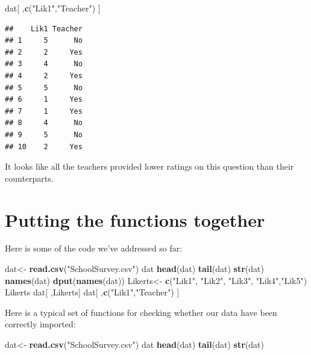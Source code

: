 \documentclass[
]{book}
\newenvironment{Shaded}{\begin{snugshade}}{\end{snugshade}}
\newcommand{\KeywordTok}[1]{\textcolor[rgb]{0.13,0.29,0.53}{\textbf{#1}}}
\newcommand{\NormalTok}[1]{#1}
\newcommand{\StringTok}[1]{\textcolor[rgb]{0.31,0.60,0.02}{#1}}
\begin{document}
\begin{Shaded}
\begin{Highlighting}[]
\NormalTok{dat[ ,}\KeywordTok{c}\NormalTok{(}\StringTok{"Lik1"}\NormalTok{,}\StringTok{"Teacher"}\NormalTok{) ]}
\end{Highlighting}
\end{Shaded}

\begin{verbatim}
##    Lik1 Teacher
## 1     5      No
## 2     2     Yes
## 3     4      No
## 4     2     Yes
## 5     5      No
## 6     1     Yes
## 7     1     Yes
## 8     4      No
## 9     5      No
## 10    2     Yes
\end{verbatim}

It looks like all the teachers provided lower ratings on this question than their counterparts.

\hypertarget{putting-the-functions-together}{%
\section{Putting the functions together}\label{putting-the-functions-together}}

Here is some of the code we've addressed so far:

\begin{Shaded}
\begin{Highlighting}[]
\NormalTok{dat<-}\StringTok{ }\KeywordTok{read.csv}\NormalTok{(}\StringTok{"SchoolSurvey.csv"}\NormalTok{)}
\NormalTok{dat}
\KeywordTok{head}\NormalTok{(dat)}
\KeywordTok{tail}\NormalTok{(dat)}
\KeywordTok{str}\NormalTok{(dat)}
\KeywordTok{names}\NormalTok{(dat)}
\KeywordTok{dput}\NormalTok{(}\KeywordTok{names}\NormalTok{(dat))}
\NormalTok{Likerts<-}\StringTok{ }\KeywordTok{c}\NormalTok{(}\StringTok{"Lik1"}\NormalTok{, }\StringTok{"Lik2"}\NormalTok{, }\StringTok{"Lik3"}\NormalTok{, }\StringTok{"Lik4"}\NormalTok{,}\StringTok{"Lik5"}\NormalTok{)}
\NormalTok{Likerts}
\NormalTok{dat[ ,Likerts]}
\NormalTok{dat[ ,}\KeywordTok{c}\NormalTok{(}\StringTok{"Lik1"}\NormalTok{,}\StringTok{"Teacher"}\NormalTok{) ]}
\end{Highlighting}
\end{Shaded}

Here is a typical set of functions for checking whether our data have been correctly imported:

\begin{Shaded}
\begin{Highlighting}[]
\NormalTok{dat<-}\StringTok{ }\KeywordTok{read.csv}\NormalTok{(}\StringTok{"SchoolSurvey.csv"}\NormalTok{)}
\NormalTok{dat}
\KeywordTok{head}\NormalTok{(dat)}
\KeywordTok{tail}\NormalTok{(dat)}
\KeywordTok{str}\NormalTok{(dat)}
\end{Highlighting}
\end{Shaded}
\end{document}
